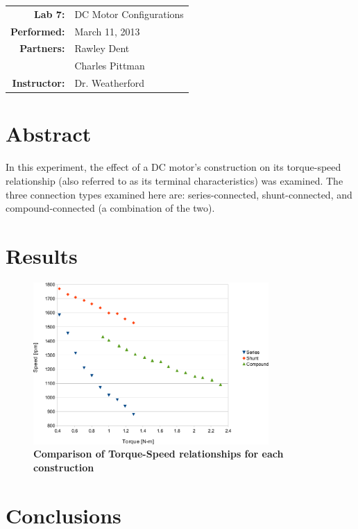\documentclass{article}
\begin{document}
\begin{tabular}{rl}
  \textbf{Lab 7:} & DC Motor Configurations \\
  \textbf{Performed:} & March 11, 2013 \\
  \textbf{Partners:} & Rawley Dent \\ & Charles Pittman \\
  \textbf{Instructor:} & Dr. Weatherford
\end{tabular}


\section*{Abstract}

In this experiment, the effect of a DC motor's construction on its torque-speed
relationship (also referred to as its terminal characteristics) was examined.
The three connection types examined here are: series-connected,
shunt-connected, and compound-connected (a combination of the two).

\section*{Results}

\begin{figure}[H]
  \centering
    \includegraphics[width=0.8\textwidth]{img/graph}
    \caption{\textbf{Comparison of Torque-Speed relationships for each
    construction}}
    \label{fig:graph}
\end{figure}

\section*{Conclusions}
\end{document}
